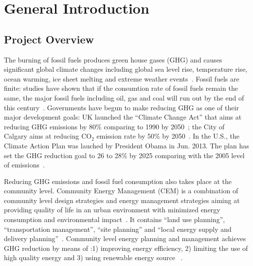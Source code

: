 
\chapter{General Introduction} %

\label{Chapter1} %



\section{Project Overview}
The burning of fossil fuels produces green house gases (GHG) and
causes significant global climate changes including global sea level
rise, temperature rise, ocean warming, ice sheet melting and extreme
weather events~\cite{NASA2015}. Fossil fuels are finite: studies have
shown that if the consumtion rate of fossil fuels remain the same, the
major fossil fuels including oil, gas and coal will run out by the end
of this century~\cite{Ecotricity2015, Kathryn2015}. Governments have
begun to make reducing GHG as one of their major development goals: UK
launched the ``Climate Change Act'' that aims at reducing GHG
emissions by 80\% comparing to 1990 by 2050~\cite{carbonBudgetUK}; the
City of Calgary aims at reducing CO$_2$ emission rate by 50\% by
2050~\cite{aacip2009}. In the U.S., the Climate Action Plan was
lauched by President Obama in Jun. 2013. The plan has set the GHG
reduction goal to 26 to 28\% by 2025 comparing with the 2005 level of
emissions~\cite{ghgReduce2014}.

Reducing GHG emissions and fossil fuel consumption also takes place at
the community level. Community Energy Management (CEM) is a
combination of community level design strategies and energy management
strategies aiming at providing quality of life in an urban environment
with minimized energy consumption and environmental
impact~\cite{Jaccard19971065}. It contains ``land use planning'',
``transportation management'', ``site planning'' and ``local energy
supply and delivery planning''~\cite{Jaccard19971065}. Community level
energy planning and management achieves GHG reduction by means of :1)
improving energy efficiency, 2) limiting the use of high quality
energy and 3) using renewable energy source ~\cite{StDenis20092088}.

